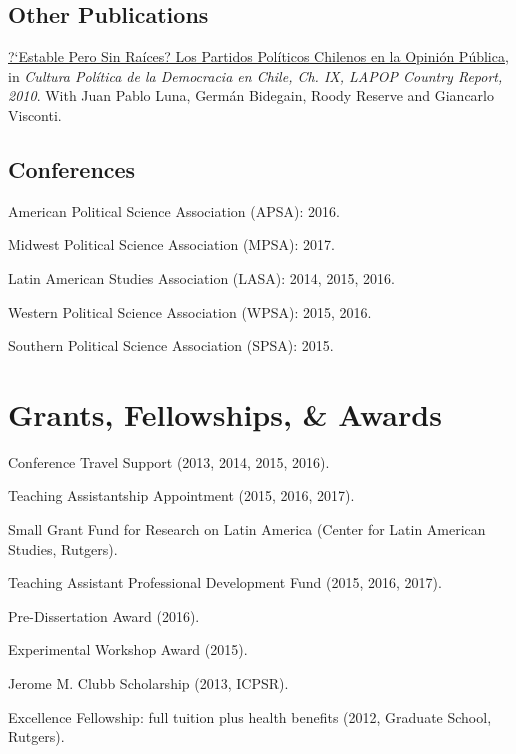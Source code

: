 \documentclass[letterpaper]{article}
\renewenvironment{itemize}{
  \begin{list}{}{
    \setlength{\leftmargin}{1.5em}
  }
}{
  \end{list}
}
\begin{document}
\subsection*{Other Publications}

\begin{itemize}
\item[$\bullet$] \href{http://www.vanderbilt.edu/lapop/chile/Chile-2010-cultura-politica.pdf}{?`Estable Pero Sin Ra\'ices? Los Partidos Pol\'iticos Chilenos en la Opini\'on P\'ublica}, in \emph{Cultura Pol\'itica de la Democracia en Chile, Ch. IX, LAPOP Country Report, 2010}. With Juan Pablo Luna, Germ\'an Bidegain, Roody Reserve and Giancarlo Visconti.
\end{itemize}

\subsection*{Conferences}

\begin{itemize}
\item American Political Science Association (APSA): 2016.
\item Midwest Political Science Association (MPSA): 2017.
\item Latin American Studies Association (LASA): 2014, 2015, 2016.
\item Western Political Science Association (WPSA): 2015, 2016.
\item Southern Political Science Association (SPSA): 2015.
\end{itemize}


\section*{Grants, Fellowships, \& Awards}

\begin{itemize}
\item Conference Travel Support (2013, 2014, 2015, 2016).
\item Teaching Assistantship Appointment (2015, 2016, 2017).
\item Small Grant Fund for Research on Latin America (Center for Latin American Studies, Rutgers).
\item Teaching Assistant Professional Development Fund (2015, 2016, 2017).
\item Pre-Dissertation Award (2016).
\item Experimental Workshop Award (2015).
\item Jerome M. Clubb Scholarship (2013, ICPSR).
\item Excellence Fellowship: full tuition plus health benefits (2012, Graduate School, Rutgers).
\end{itemize}
\end{document}
